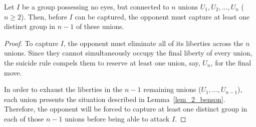 \begin{lemma}\label{lem_3_benson}
	Let \(I\) be a group possessing no eyes, but connected to \(n\) unions \(U_1, U_2, \dots, U_n\) (\(n \ge 2\)). Then, before \(I\) can be captured, the opponent must capture at least one distinct group in \(n-1\) of these unions.
\end{lemma}
\begin{proof}
	To capture \(I\), the opponent must eliminate all of its liberties across the \(n\) unions. Since they cannot simultaneously occupy the final liberty of every union, the suicide rule compels them to reserve at least one union, say, \(U_n\), for the final move.

	In order to exhaust the liberties in the \(n-1\) remaining unions (\(U_1, \dots, U_{n-1}\)), each union presents the situation described in Lemma~\ref{lem_2_benson}. Therefore, the opponent will be forced to capture at least one distinct group in each of those \(n-1\) unions before being able to attack \(I\).
\end{proof}
